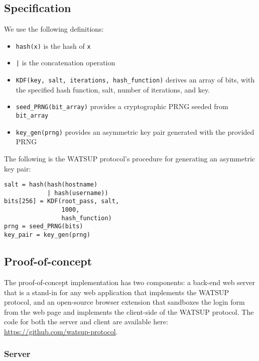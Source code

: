 \subsection{Specification}

We use the following definitions:

\begin{itemize}

    \item \texttt{hash(x)} is the hash of \texttt{x}

    \item \texttt{|} is the concatenation operation

    \item \texttt{KDF(key, salt, iterations, hash\_function)} derives an array of bits, with the specified hash function, salt, number of iterations, and key.

    \item \texttt{seed\_PRNG(bit\_array)} provides a cryptographic PRNG seeded from \texttt{bit\_array}

    \item \texttt{key\_gen(prng)} provides an asymmetric key pair generated with the provided PRNG

\end{itemize}

The following is the WATSUP protocol's procedure for generating an asymmetric key pair:

\begin{verbatim}
salt = hash(hash(hostname)
            | hash(username))
bits[256] = KDF(root_pass, salt,
                1000,
                hash_function)
prng = seed_PRNG(bits)
key_pair = key_gen(prng)
\end{verbatim}

\subsection{Proof-of-concept}

The proof-of-concept implementation has two components: a back-end web server that is a stand-in for any web application that implements the WATSUP protocol, and an open-source browser extension that sandboxes the login form from the web page and implements the client-side of the WATSUP protocol. The code for both the server and client are available here: \url{https://github.com/watsup-protocol}.

\subsubsection{Server}

